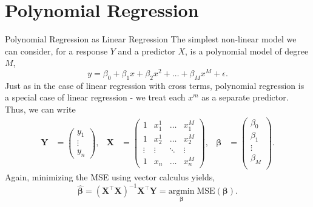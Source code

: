 \documentclass[12pt,t]{beamer}
\begin{document}
\section{Polynomial Regression}

\begin{frame}{Polynomial Regression as Linear Regression} \footnotesize
\vskip-0.4cm
The simplest non-linear model we can consider, for a response $Y$ and a predictor $X$, is a polynomial model of degree $M$,
\[
y = \beta_0 + \beta_1 x + \beta_2 x^2 + \ldots + \beta_M x^M + \epsilon.
\]
Just as in the case of linear regression with cross terms, polynomial regression is a special case of linear regression - we treat each $x^m$ as a separate predictor. Thus, we can write
\begin{align*}
\mathbf{Y} &= \left( \begin{array}{c}
y_1\\
\vdots\\
y_n
\end{array} \right),& \mathbf{X} &= \left( \begin{array}{cccc}
1 & x^1_{1} & \ldots &  x^M_{1}\\
1 & x^1_{2} & \ldots &  x^M_{2}\\
\vdots & \vdots & \ddots & \vdots\\
1 & x_{n} &\ldots & x^M_{n}
\end{array} \right), & \pmb{\beta} &=  \left( \begin{array}{c}
\beta_0\\
\beta_1\\
\vdots\\
\beta_M\\
\end{array} \right).
\end{align*}
Again, minimizing the MSE using vector calculus yields,
\[
\widehat{\pmb{\beta}} = \left( \mathbf{X}^\top  \mathbf{X} \right)^{-1} \mathbf{X}^\top  \mathbf{Y} = \underset{\pmb{\beta}}{\mathrm{argmin}}\; \mathrm{MSE}(\pmb{\beta}).
\]
\end{frame}
\end{document}
